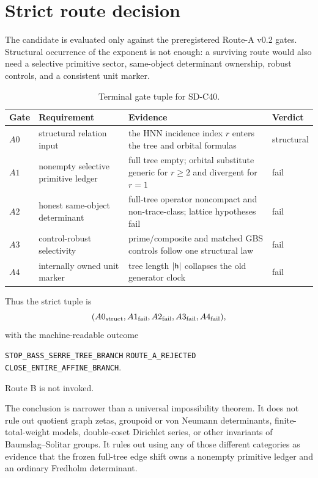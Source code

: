 \section{Strict route decision}
\label{sec:route}

The candidate is evaluated only against the preregistered Route-A v0.2
gates.  Structural occurrence of the exponent is not enough: a surviving
route would also need a selective primitive sector, same-object determinant
ownership, robust controls, and a consistent unit marker.

\begin{table}[H]
\centering
\small
\caption{Terminal gate tuple for SD-C40.}
\label{tab:route}
\begin{tabularx}{\textwidth}{L{1.2cm}L{3.2cm}YL{1.9cm}}
\toprule
Gate & Requirement & Evidence & Verdict \\
\midrule
$A0$ & structural relation input & the HNN incidence index $r$ enters the
tree and orbital formulas & structural \\
$A1$ & nonempty selective primitive ledger & full tree empty; orbital
substitute generic for $r\ge2$ and divergent for $r=1$ & fail \\
$A2$ & honest same-object determinant & full-tree operator noncompact and
non-trace-class; lattice hypotheses fail & fail \\
$A3$ & control-robust selectivity & prime/composite and matched GBS controls
follow one structural law & fail \\
$A4$ & internally owned unit marker & tree length $|\mathsf{h}|$ collapses the
old generator clock & fail \\
\bottomrule
\end{tabularx}
\end{table}

Thus the strict tuple is
\begin{equation}
  (A0_{\mathrm{struct}},A1_{\mathrm{fail}},A2_{\mathrm{fail}},A3_{\mathrm{fail}},A4_{\mathrm{fail}}),
\end{equation}
with the machine-readable outcome
\begin{center}
\texttt{STOP\_BASS\_SERRE\_TREE\_BRANCH}\quad
\texttt{ROUTE\_A\_REJECTED}\quad
\texttt{CLOSE\_ENTIRE\_AFFINE\_BRANCH}.
\end{center}
Route B is not invoked.

The conclusion is narrower than a universal impossibility theorem.  It does
not rule out quotient graph zetas, groupoid or von Neumann determinants,
finite-total-weight models, double-coset Dirichlet series, or other
invariants of Baumslag--Solitar groups.  It rules out using any of those
different categories as evidence that the frozen full-tree edge shift owns
a nonempty primitive ledger and an ordinary Fredholm determinant.

